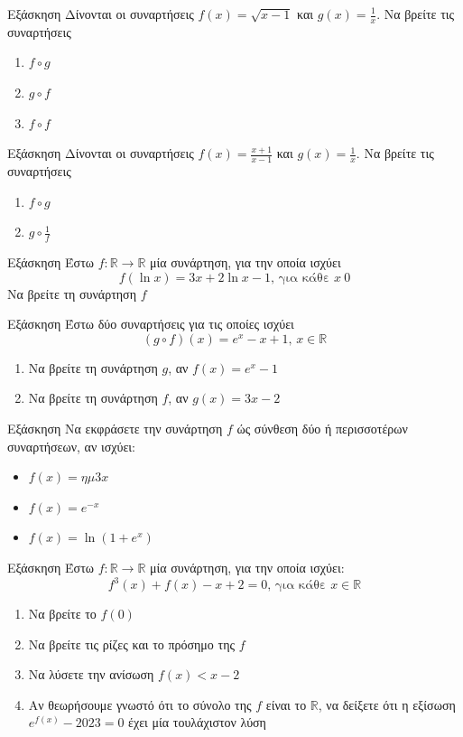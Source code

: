 \documentclass[greek]{beamer}
\begin{document}
\begin{frame}{Εξάσκηση}
 Δίνονται οι συναρτήσεις $f(x)=\sqrt{x-1}$ και $g(x)=\frac{1}{x}$. Να βρείτε τις συναρτήσεις
 \begin{enumerate}
  \item<1-> $f\circ g$
  \item<2-> $g\circ f$
  \item<3-> $f\circ f$
 \end{enumerate}
\end{frame}

\begin{frame}{Εξάσκηση}
 Δίνονται οι συναρτήσεις $f(x)=\frac{x+1}{x-1}$ και $g(x)=\frac{1}{x}$. Να βρείτε τις συναρτήσεις
 \begin{enumerate}
  \item<1-> $f\circ g$
  \item<2-> $g\circ \frac{1}{f}$
 \end{enumerate}
\end{frame}

\begin{frame}{Εξάσκηση}
 Έστω $f:\mathbb{R}\to\mathbb{R}$ μία συνάρτηση, για την οποία ισχύει
 $$f(\ln x)=3x+2\ln x -1\text{, για κάθε } x\>0$$
 Να βρείτε τη συνάρτηση $f$
\end{frame}

\begin{frame}{Εξάσκηση}
 Έστω δύο συναρτήσεις για τις οποίες ισχύει
 $$(g\circ f)(x)=e^x-x+1\text{, } x\in\mathbb{R}$$
 \begin{enumerate}
  \item<1-> Να βρείτε τη συνάρτηση $g$, αν $f(x)=e^x-1$
  \item<2-> Να βρείτε τη συνάρτηση $f$, αν $g(x)=3x-2$
 \end{enumerate}
\end{frame}

\begin{frame}{Εξάσκηση}
 Να εκφράσετε την συνάρτηση $f$ ώς σύνθεση δύο ή περισσοτέρων συναρτήσεων, αν ισχύει:
 \begin{itemize}
  \item $f(x)=ημ 3x$
  \item $f(x)=e^{-x}$
  \item $f(x)=\ln (1+e^x)$
 \end{itemize}
\end{frame}

\begin{frame}{Εξάσκηση}
 Έστω $f:\mathbb{R}\to\mathbb{R}$ μία συνάρτηση, για την οποία ισχύει:
 $$f^3(x)+f(x)-x+2=0\text{, για κάθε } x\in\mathbb{R}$$
 \begin{enumerate}
  \item<1-> Να βρείτε το $f(0)$
  \item<2-> Να βρείτε τις ρίζες και το πρόσημο της $f$
  \item<3-> Να λύσετε την ανίσωση $f(x)<x-2$
  \item<4-> Αν θεωρήσουμε γνωστό ότι το σύνολο της $f$ είναι το $\mathbb{R}$, να δείξετε ότι η εξίσωση $e^{f(x)}-2023=0$ έχει μία τουλάχιστον λύση
 \end{enumerate}
\end{frame}
\end{document}
